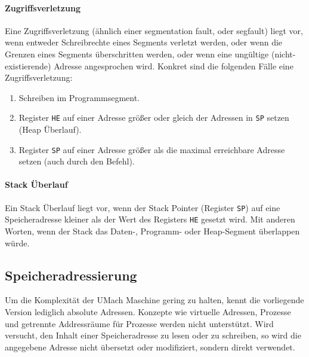 \paragraph{Zugriffsverletzung}

Eine Zugriffsverletzung (ähnlich einer \glqq segmentation fault\grqq, oder
\glqq segfault\grqq)  liegt vor, wenn entweder Schreibrechte
eines Segments verletzt werden, oder wenn die Grenzen eines Segments
überschritten werden, oder wenn eine ungültige (nicht-existierende) Adresse
angesprochen wird. Konkret sind die folgenden Fälle eine Zugriffsverletzung:
\begin{enumerate}
 \item Schreiben im Programmsegment.
 \item Register \texttt{HE} auf einer Adresse größer oder gleich der Adressen in
       \texttt{SP} setzen (Heap Überlauf).
 \item Register \texttt{SP} auf einer Adresse größer als die maximal erreichbare
       Adresse setzen (auch durch den  Befehl).
\end{enumerate}



\paragraph{Stack Überlauf}
Ein Stack Überlauf liegt vor, wenn der Stack Pointer (Register \texttt{SP})
 auf eine Speicheradresse kleiner als der Wert des
Registers \texttt{HE} gesetzt wird. Mit anderen Worten, wenn der Stack das
Daten-, Programm- oder Heap-Segment überlappen würde.


\subsection{Speicheradressierung}

Um die Komplexität der UMach Maschine gering zu halten, kennt die vorliegende
Version lediglich absolute Adressen. Konzepte wie virtuelle Adressen,
Prozesse und getrennte Addressräume für Prozesse werden nicht
unterstützt. Wird versucht, den Inhalt einer Speicheradresse zu lesen oder zu
schreiben, so wird die angegebene Adresse nicht übersetzt oder modifiziert,
sondern direkt verwendet.

